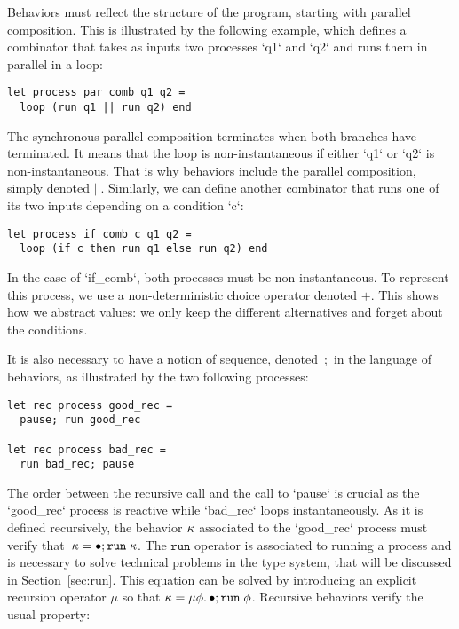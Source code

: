 \documentclass[9pt,preprint]{sigplanconf}
\begin{document}
Behaviors must reflect the structure of the program, starting with parallel composition. This is illustrated by the following example, which defines a combinator that takes as inputs two processes `q1` and `q2` and runs them in parallel in a loop: 
\begin{lstlisting}
let process par_comb q1 q2 =
  loop (run q1 || run q2) end
\end{lstlisting}
The synchronous parallel composition terminates when both bran\-ches have terminated. It means that the loop is non-instantaneous if either `q1` or `q2` is non-instantaneous.  That is why behaviors include the parallel composition, simply denoted $||$.
%
Similarly, we can define another combinator that runs one of its two inputs depending on a condition `c`:
\begin{lstlisting}
let process if_comb c q1 q2 =
  loop (if c then run q1 else run q2) end
\end{lstlisting}
In the case of `if_comb`, both processes must be non-instantaneous. To represent this process, we use a non-deterministic choice operator denoted $+$. This shows how  we abstract values: we only keep the different alternatives and forget about the conditions.

It is also necessary to have a notion of sequence, denoted~$;$ in the language of behaviors, as illustrated by the two following processes: 
\begin{lstlisting}
let rec process good_rec = 
  pause; run good_rec
  
let rec process bad_rec = 
  run bad_rec; pause
\end{lstlisting}
The order between the recursive call and the call to `pause` is crucial as the `good_rec` process is reactive while `bad_rec` loops instantaneously.
%
As it is defined recursively, the behavior  $\kappa$  associated to the `good_rec` process must verify that~\mbox{$ \kappa = \bullet ; \mathtt{run}\; \kappa$}. The $\mathtt{run}$ operator is associated to running a process and is necessary to solve technical problems in the type system, that will be discussed in Section~\ref{sec:run}. This equation can be solved by introducing an explicit recursion operator $\mu$ so that $\kappa = \mu \phi.\, \bullet ; \mathtt{run}\; \phi$. Recursive behaviors verify the usual property:
\end{document}
